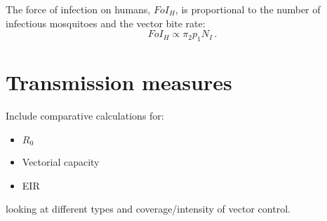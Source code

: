 The force of infection on humans, $FoI_H$, is proportional to the number of infectious mosquitoes and the vector bite rate:
\begin{equation}
FoI_H \propto \pi_2p_1N_I\,.
\end{equation}

\section{Transmission measures}

Include comparative calculations for:
\begin{itemize}
\item $R_0$
\item Vectorial capacity
\item EIR
\end{itemize}
looking at different types and coverage/intensity of vector control.
\\


%

